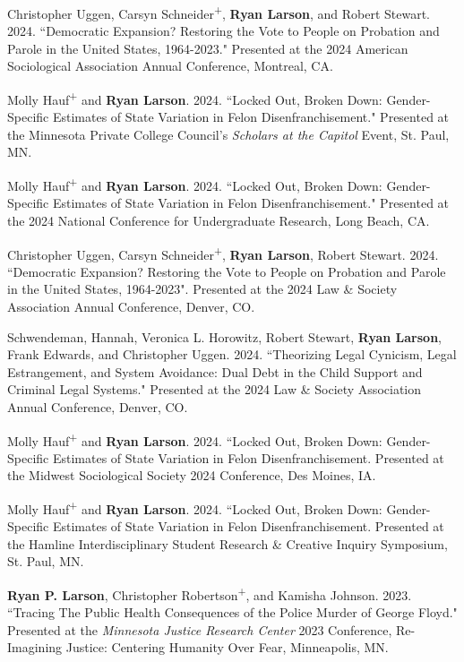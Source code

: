\documentclass[letterpaper]{article}
\renewenvironment{itemize}{
  \begin{list}{}{
    \setlength{\leftmargin}{1.5em}
  }
}{
  \end{list}
}
\begin{document}
\begin{itemize}
\item Christopher Uggen, Carsyn Schneider\textsuperscript{+}, \textbf{Ryan Larson}, and Robert Stewart. 2024. ``Democratic Expansion? Restoring the Vote to People on Probation and Parole in the United States, 1964-2023." Presented at the 2024 American Sociological Association Annual Conference, Montreal, CA. 

\item Molly Hauf\textsuperscript{+} and \textbf{Ryan Larson}. 2024. ``Locked Out, Broken Down: Gender-Specific Estimates of State Variation in Felon Disenfranchisement." Presented at the Minnesota Private College Council's \textit{Scholars at the Capitol} Event, St. Paul, MN. 

\item Molly Hauf\textsuperscript{+} and \textbf{Ryan Larson}. 2024. ``Locked Out, Broken Down: Gender-Specific Estimates of State Variation in Felon Disenfranchisement." Presented at the 2024 National Conference for Undergraduate Research, Long Beach, CA. 

\item Christopher Uggen, Carsyn Schneider\textsuperscript{+}, \textbf{Ryan Larson}, Robert Stewart. 2024. ``Democratic Expansion? Restoring the Vote to People on Probation and Parole in the United States, 1964-2023". Presented at the 2024 Law \& Society Association Annual Conference, Denver, CO. 

\item Schwendeman, Hannah, Veronica L. Horowitz, Robert Stewart, \textbf{Ryan Larson}, Frank Edwards, and Christopher Uggen. 2024.  ``Theorizing Legal Cynicism, Legal Estrangement, and System Avoidance: Dual Debt in the Child Support and Criminal Legal Systems." Presented at the 2024 Law \& Society Association Annual Conference, Denver, CO. 

\item Molly Hauf\textsuperscript{+} and \textbf{Ryan Larson}. 2024. ``Locked Out, Broken Down: Gender-Specific Estimates of State Variation in Felon Disenfranchisement. Presented at the Midwest Sociological Society 2024 Conference, Des Moines, IA. 

\item Molly Hauf\textsuperscript{+} and \textbf{Ryan Larson}. 2024. ``Locked Out, Broken Down: Gender-Specific Estimates of State Variation in Felon Disenfranchisement. Presented at the Hamline Interdisciplinary Student Research \& Creative Inquiry Symposium, St. Paul, MN. 

\item \textbf{Ryan P. Larson}, Christopher Robertson\textsuperscript{+}, and Kamisha Johnson. 2023. ``Tracing The Public Health Consequences of the Police Murder of George Floyd." Presented at the \textit{Minnesota Justice Research Center} 2023 Conference, Re-Imagining Justice: Centering Humanity Over Fear, Minneapolis, MN.   


\end{itemize}
\end{document}
